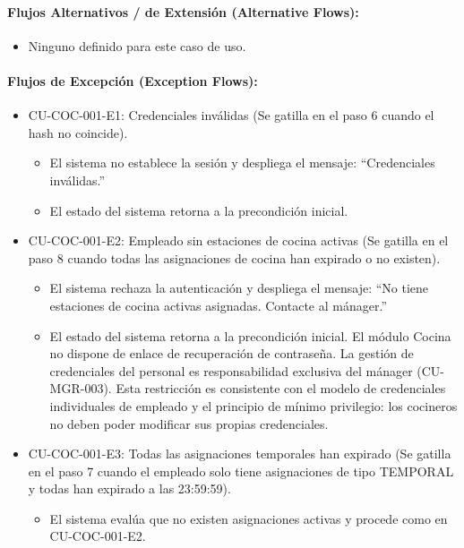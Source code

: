 \paragraph{Flujos Alternativos / de Extensión (Alternative Flows):}
\begin{itemize}
    \item Ninguno definido para este caso de uso.
\end{itemize}

\paragraph{Flujos de Excepción (Exception Flows):}
\begin{itemize}
    \item CU-COC-001-E1: Credenciales inválidas (Se gatilla en el paso 6 cuando el hash no coincide).
    \begin{itemize}
        \item El sistema no establece la sesión y despliega el mensaje: ``Credenciales inválidas.''
        \item El estado del sistema retorna a la precondición inicial.
    \end{itemize}
    \item CU-COC-001-E2: Empleado sin estaciones de cocina activas (Se gatilla en el paso 8 cuando todas las asignaciones de cocina han expirado o no existen).
    \begin{itemize}
        \item El sistema rechaza la autenticación y despliega el mensaje: ``No tiene estaciones de cocina activas asignadas. Contacte al mánager.''
        \item El estado del sistema retorna a la precondición inicial. El módulo Cocina no dispone de enlace de recuperación de contraseña. La gestión de credenciales del personal es responsabilidad exclusiva del mánager (CU-MGR-003). Esta restricción es consistente con el modelo de credenciales individuales de empleado y el principio de mínimo privilegio: los cocineros no deben poder modificar sus propias credenciales.
    \end{itemize}
    \item CU-COC-001-E3: Todas las asignaciones temporales han expirado (Se gatilla en el paso 7 cuando el empleado solo tiene asignaciones de tipo TEMPORAL y todas han expirado a las 23:59:59).
    \begin{itemize}
        \item El sistema evalúa que no existen asignaciones activas y procede como en CU-COC-001-E2.
    \end{itemize}
\end{itemize}

